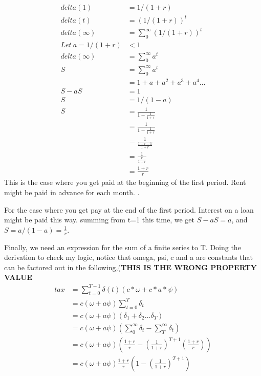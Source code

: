 \begin{align}
delta (1)   &= 1/(1+r) \\
delta (t)   &= (1/(1+r))^t \\
delta (\infty)   &= \sum_0^\infty\left(1/(1+r)\right)^t\\ 
Let\ a=1/(1+r)&<1\\
delta (\infty)   &= \sum_0^\infty a^t\\ 
S               &= \sum_0^\infty a^t\\ 
               &= 1+a+a^2+a^3+a^4 \dots\\ 
S-aS             &= 1\\ 
S             &= 1/(1-a)\\ 
S             &= \frac{1}{1-\frac{1}{1+r}}\\ %
             &= \frac{1}{1-\frac{1}{1+r}}\\ 
             &= \frac{1}{\frac{1+r-1}{1+r}}\\ 
              &= \frac{1}{\frac{r}{1+r}}\\ 
             &= \frac{1+r}{r}
\end{align}
This is the case where you get paid at the beginning of the first period. Rent might be paid in advance for each month. .

For  the case where you get pay at the end of the first period. Interest on a loan  might be paid this way.  summing from t=1 this time, we get $S-aS =a$, and $S = a/(1-a)= \frac{1}{r}$. 

 


Finally, we need an expression for the sum of a finite  series to T.  Doing the derivation to check my logic, notice that  omega, psi, c  and a are constants that can be factored out in the following,(\textbf{THIS IS THE WRONG PROPERTY VALUE}
\begin{align}%
    tax&= \sum_{t=0}^{T-1} \delta(t) \left(c*\omega + c*a*\psi \right)\\
        &= c(\omega + a\psi)\sum_{t=0}^T  \delta_t\\
        &= c(\omega + a\psi)(\delta_1+\delta_2 \dots \delta_T)\\
        &= c(\omega + a\psi) \left(\sum_0^\infty \delta_t-\sum_{T}^\infty \delta_t\right)\\
        &= c(\omega + a\psi) \left(\frac{1+r}{r}  - \left(\frac{1}{1+r}\right)^{T+1} \left(\frac{1+r}{r} \right) \right)\\
        &= c(\omega + a\psi) \frac{1+r}{r}\left(1  - \left(\frac{1}{1+r}\right)^{T+1} \right)
\end{align}








